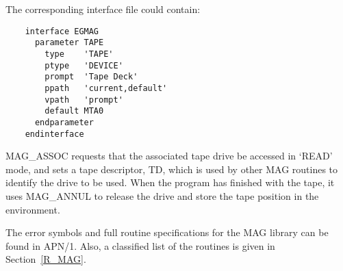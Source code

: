 The corresponding interface file could contain:

\begin{small}
\begin{verbatim}
    interface EGMAG
      parameter TAPE
        type    'TAPE'
        ptype   'DEVICE'
        prompt  'Tape Deck'
        ppath   'current,default'
        vpath   'prompt'
        default MTA0
      endparameter
    endinterface
\end{verbatim}
\end{small}

MAG\_ASSOC requests that the associated tape drive be accessed in `READ' mode,
and sets a tape descriptor, TD, which is used by other MAG routines to identify
the drive to be used.
When the program has finished with the tape, it uses MAG\_ANNUL to release the
drive and store the tape position in the environment.

The error symbols and full routine specifications for the MAG library can be
found in APN/1.
Also, a classified list of the routines is given in Section~\ref{R_MAG}.
